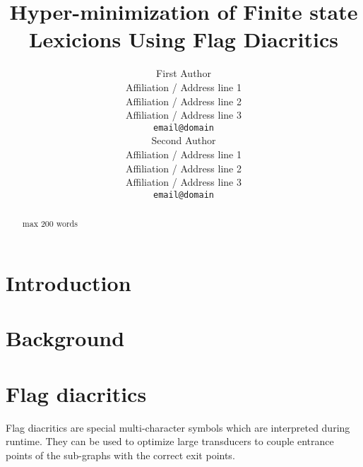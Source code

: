 \documentclass[11pt]{article}
\title{Hyper-minimization of Finite state Lexicions Using Flag Diacritics}
\author{First Author \\
  Affiliation / Address line 1 \\
  Affiliation / Address line 2 \\
  Affiliation / Address line 3 \\
  {\tt email@domain} \\\And
  Second Author \\
  Affiliation / Address line 1 \\
  Affiliation / Address line 2 \\
  Affiliation / Address line 3 \\
  {\tt email@domain} \\}
\date{}
\begin{document}
\maketitle
\begin{abstract}
  max 200 words
\end{abstract}




\section{Introduction}
%
% 

\section{Background}

\label{sec:background}

 
\section{Flag diacritics}
\label{sec:flags}

Flag diacritics are special multi-character symbols which are interpreted during runtime. They can be used to optimize large transducers to couple entrance points of the sub-graphs with the correct exit points.
\end{document}
